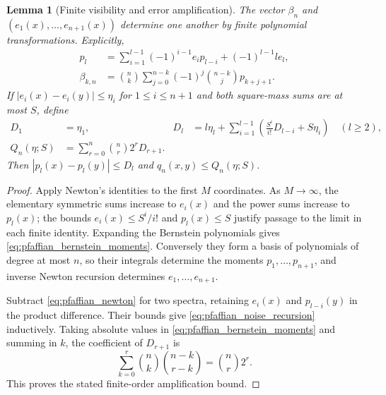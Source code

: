 \documentclass[11pt,a4paper]{amsart}
\numberwithin{equation}{section}
\newtheorem{lemma}[theorem]{Lemma}
\theoremstyle{definition}
\theoremstyle{remark}
\begin{document}
\begin{lemma}[Finite visibility and error amplification]\label{lem:pfaffian_newton}
The vector $\beta_n$ and $(e_1(x),\ldots,e_{n+1}(x))$ determine one another by finite polynomial transformations. Explicitly,
\begin{align}
 p_l&=\sum_{i=1}^{l-1}(-1)^{i-1}e_i p_{l-i}+(-1)^{l-1}le_l,
 \label{eq:pfaffian_newton}\\
 \beta_{k,n}&=\binom nk\sum_{j=0}^{n-k}(-1)^j\binom{n-k}j p_{k+j+1}.
 \label{eq:pfaffian_bernstein_moments}
\end{align}
If $|e_i(x)-e_i(y)|\le\eta_i$ for $1\le i\le n+1$ and both square-mass sums are at most $S$, define
\begin{align}
 D_1&=\eta_1,&
 D_l&=l\eta_l+\sum_{i=1}^{l-1}
       \left(\frac{S^i}{i!}D_{l-i}+S\eta_i\right)\quad(l\ge2),
 \label{eq:pfaffian_noise_recursion}\\
 Q_n(\eta;S)&=\sum_{r=0}^n\binom nr2^rD_{r+1}.
 \label{eq:pfaffian_noise_budget}
\end{align}
Then $|p_l(x)-p_l(y)|\le D_l$ and $q_n(x,y)\le Q_n(\eta;S)$.
\end{lemma}
\begin{proof}
Apply Newton's identities to the first $M$ coordinates. As $M\to\infty$, the elementary symmetric sums increase to $e_i(x)$ and the power sums increase to $p_l(x)$; the bounds $e_i(x)\le S^i/i!$ and $p_l(x)\le S$ justify passage to the limit in each finite identity. Expanding the Bernstein polynomials gives \eqref{eq:pfaffian_bernstein_moments}. Conversely they form a basis of polynomials of degree at most $n$, so their integrals determine the moments $p_1,\ldots,p_{n+1}$, and inverse Newton recursion determines $e_1,\ldots,e_{n+1}$.

Subtract \eqref{eq:pfaffian_newton} for two spectra, retaining $e_i(x)$ and $p_{l-i}(y)$ in the product difference. Their bounds give \eqref{eq:pfaffian_noise_recursion} inductively. Taking absolute values in \eqref{eq:pfaffian_bernstein_moments} and summing in $k$, the coefficient of $D_{r+1}$ is
\[
 \sum_{k=0}^r\binom nk\binom{n-k}{r-k}=\binom nr2^r.
\]
This proves the stated finite-order amplification bound.
\end{proof}
\end{document}

